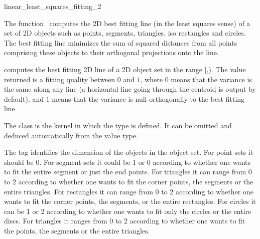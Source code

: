 
\begin{ccRefFunction}{linear_least_squares_fitting_2}  

\ccDefinition
  
The function \ccRefName\ computes the 2D best fitting line (in the least squares sense) of a set of 2D objects such as points, segments, triangles, iso rectangles and circles. The best fitting line minimizes the sum of squared distances from all points comprising these objects to their orthogonal projections onto the line.


{ computes the best fitting 2D line of a 2D object set in the range
[,). The value returned is a fitting quality
between $0$ and $1$, where $0$ means that the variance is the same
along any line (a horizontal line going through the centroid is output
by default), and $1$ means that the variance is null orthogonally
to the best fitting line.
 }

The class  is the kernel in which the type  is defined. It can be omitted and deduced automatically from the value type.

The tag  identifies the dimension of the objects in the object set. For point sets it should be 0. For segment sets it could be 1 or 0 according to whether one wants to fit the entire segment or just the end points. For triangles it can range from 0 to 2 according to whether one wants to fit the corner points, the segments or the entire triangles. For rectangles it can range from 0 to 2 according to whether one wants to fit the corner points, the segments, or the entire rectangles. For circles it can be 1 or 2 according to whether one wants to fit only the circles or the entire discs. For triangles it ranges from 0 to 2 according to whether one wants to fit the points, the segments or the entire triangles.



\end{ccRefFunction}
